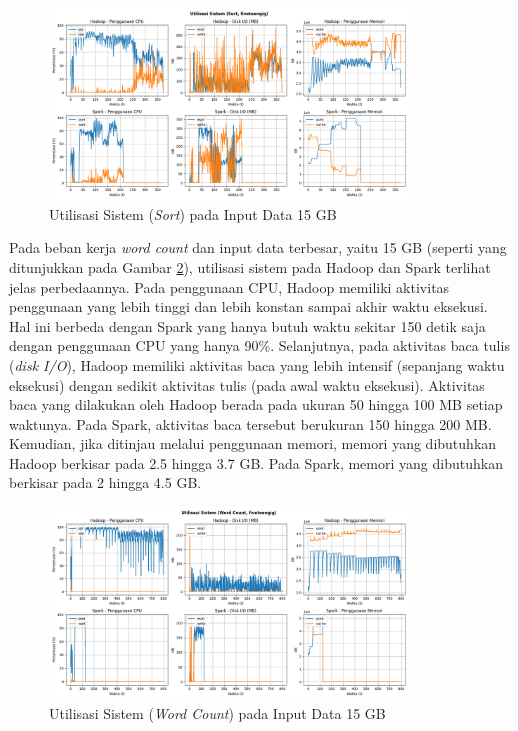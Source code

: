 \begin{figure}[h]
    \centering
    \includegraphics[width=0.85\textwidth]{figures/ch04/5-util-sistem-sort-fiveteengig}
    \caption{Utilisasi Sistem (\textit{Sort}) pada Input Data 15 GB}
    \label{fig:5-util-sistem-sort-fiveteengig}
\end{figure}

Pada beban kerja \textit{word count} dan input data terbesar, yaitu 15 GB (seperti yang ditunjukkan pada Gambar \ref{fig:5-util-sistem-wordcount-fiveteengig}), utilisasi sistem pada Hadoop dan Spark terlihat jelas perbedaannya. Pada penggunaan CPU, Hadoop memiliki aktivitas penggunaan yang lebih tinggi dan lebih konstan sampai akhir waktu eksekusi. Hal ini berbeda dengan Spark yang hanya butuh waktu sekitar 150 detik saja dengan penggunaan CPU yang hanya 90\%. Selanjutnya, pada aktivitas baca tulis (\textit{disk I/O}), Hadoop memiliki aktivitas baca yang lebih intensif (sepanjang waktu eksekusi) dengan sedikit aktivitas tulis (pada awal waktu eksekusi). Aktivitas baca yang dilakukan oleh Hadoop berada pada ukuran 50 hingga 100 MB setiap waktunya. Pada Spark, aktivitas baca tersebut berukuran 150 hingga 200 MB. Kemudian, jika ditinjau melalui penggunaan memori, memori yang dibutuhkan Hadoop berkisar pada 2.5 hingga 3.7 GB. Pada Spark, memori yang dibutuhkan berkisar pada 2 hingga 4.5 GB.  

\begin{figure}[h]
    \centering
    \includegraphics[width=0.85\textwidth]{figures/ch04/5-util-sistem-wordcount-fiveteengig}
    \caption{Utilisasi Sistem (\textit{Word Count}) pada Input Data 15 GB}
    \label{fig:5-util-sistem-wordcount-fiveteengig}
\end{figure}

